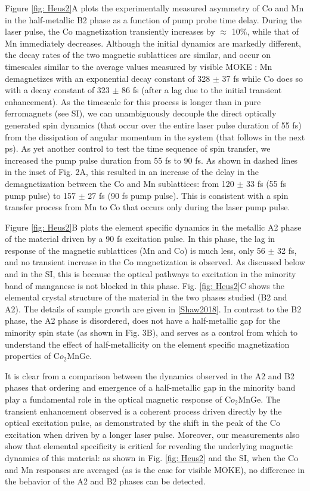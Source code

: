 Figure \ref{fig: Heus2}A plots the experimentally measured asymmetry of Co and Mn in the half-metallic B2 phase as a function of pump probe time delay. During the laser pulse, the Co magnetization transiently increases by $\approx$ 10\%, while that of Mn immediately decreases. Although the initial dynamics are markedly different, the decay rates of the two magnetic sublattices are similar, and occur on timescales similar to the average values measured by visible MOKE \cite{Mann2012}: Mn demagnetizes with an exponential decay constant of 328 $\pm$ 37 fs while Co does so with a decay constant of  323 $\pm$ 86 fs (after a lag due to the initial transient enhancement). As the timescale for this process is longer than in pure ferromagnets (see SI), we can unambiguously decouple the direct optically generated spin dynamics (that occur over the entire laser pulse duration of 55 fs) from the dissipation of angular momentum in the system (that follows in the next ps). As yet another control to test the time sequence of spin transfer, we increased the pump pulse duration from 55 fs to 90 fs. As shown in dashed lines in the inset of Fig. 2A, this resulted in an increase of the delay in the demagnetization between the Co and Mn sublattices: from 120 $\pm$ 33 fs (55 fs pump pulse) to 157 $\pm$ 27 fs (90 fs pump pulse). This is consistent with a spin transfer process from Mn to Co that occurs only during the laser pump pulse.

Figure \ref{fig: Heus2}B plots the element specific dynamics in the metallic A2 phase of the material driven by a 90 fs excitation pulse. In this phase, the lag in response of the magnetic sublattices (Mn and Co) is much less, only 56 $\pm$ 32 fs, and no transient increase in the Co magnetization is observed. As discussed below and in the SI, this is because the optical pathways to excitation in the minority band of manganese is not blocked in this phase. Fig. \ref{fig: Heus2}C shows the elemental crystal structure of the material in the two phases studied (B2 and A2). The details of sample growth are given in \ref{Shaw2018}. In contrast to the B2 phase, the A2 phase is disordered, does not have a half-metallic gap for the minority spin state (as shown in Fig. 3B), and serves as a control from which to understand the effect of half-metallicity on the element specific magnetization properties of C$o_2$MnGe.

It is clear from a comparison between the dynamics observed in the A2 and B2 phases that ordering and emergence of a half-metallic gap in the minority band play a fundamental role in the optical magnetic response of C$o_2$MnGe. The transient enhancement observed is a coherent process driven directly by the optical excitation pulse, as demonstrated by the shift in the peak of the Co excitation when driven by a longer laser pulse. Moreover, our measurements also show that elemental specificity is critical for revealing the underlying magnetic dynamics of this material: as shown in Fig. \ref{fig: Heus2} and the SI, when the Co and Mn responses are averaged (as is the case for visible MOKE), no difference in the behavior of the A2 and B2 phases can be detected. 


